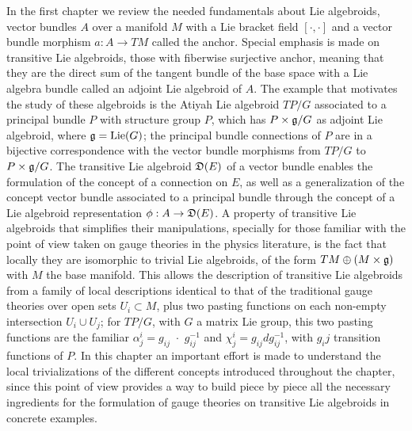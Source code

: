 In the first chapter we review the needed fundamentals about Lie algebroids, vector bundles $A$ over a manifold $M$ with a Lie bracket field $[\cdot, \cdot ]$ and a vector bundle morphism $a:A \to TM$ called the anchor. Special emphasis is made on transitive Lie algebroids, those with fiberwise surjective anchor, meaning that they are the direct sum of the tangent bundle of the base space with a Lie algebra bundle called an adjoint Lie algebroid of $A$. The example that motivates the study of these algebroids is the Atiyah Lie algebroid $TP/G$ associated to a principal bundle $P$ with structure group $P$, which has $P \times \mathfrak{g}/G$ as adjoint Lie algebroid, where $\mathfrak{g} = \text{Lie}(G)$; the principal bundle connections of $P$ are in a bijective correspondence with the vector bundle morphisms from $TP/G$ to $P \times \mathfrak{g}/G$. The transitive Lie algebroid $\mathfrak{D}(E)$ of a vector bundle enables the formulation of the concept of a connection on $E$, as well as a generalization of the concept vector bundle associated to a principal bundle through the concept of a Lie algebroid representation $\phi: A \to \alg D(E)$. A property of transitive Lie algebroids that simplifies their manipulations, specially for those familiar with the point of view taken on gauge theories in the physics literature, is the fact that locally they are isomorphic to trivial Lie algebroids, of the form $TM \oplus (M \times \mathfrak{g})$ with $M$ the base manifold. This allows the description of transitive Lie algebroids from a family of local descriptions identical to that of the traditional gauge theories over open sets $U_i \subset M$, plus two pasting functions on each non-empty intersection $U_i \cup U_j$; for $TP/G$, with $G$ a matrix Lie group, this two pasting functions are the familiar $\alpha^i_j = g_{ij} \,\,\cdot \,\, g_{ij}^{-1}$ and $\chi^i_j = g_{ij} dg_{ij}^{-1}$, with $g_ij$ transition functions of $P$. In this chapter an important effort is made to understand the local trivializations of the different concepts introduced throughout the chapter, since this point of view provides a way to build piece by piece all the necessary ingredients for the formulation of gauge theories on transitive Lie algebroids in concrete examples.

